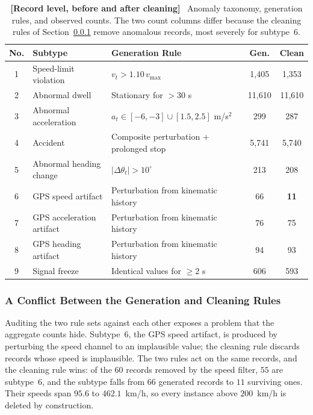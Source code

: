 \documentclass[journal]{IEEEtran}
\begin{document}
\begin{table}[!htbp]
  \centering
  \caption{\textbf{[Record level, before and after cleaning]}~ Anomaly taxonomy, generation rules, and observed counts. The two count columns differ because the cleaning rules of Section~\ref{sec:cleaning_conflict} remove anomalous records, most severely for subtype~6.}
  \label{tab:anomaly_taxonomy}
  \renewcommand{\arraystretch}{1.15}
  \footnotesize
  \begin{tabularx}{\columnwidth}{@{}c>{\raggedright\arraybackslash}p{}>{\raggedright\arraybackslash}X c c@{}}
    \toprule
    \textbf{No.} & \textbf{Subtype} & \textbf{Generation Rule} & \textbf{Gen.} & \textbf{Clean} \\ \midrule
    1 & Speed-limit violation & $v_t > 1.10\,v_{\max}$ & 1{,}405 & 1{,}353 \\
    2 & Abnormal dwell & Stationary for $>30$ s & 11{,}610 & 11{,}610 \\
    3 & Abnormal acceleration & $a_t\in[-6,-3]\cup[1.5,2.5]$ m/s$^2$ & 299 & 287 \\
    4 & Accident & Composite perturbation + prolonged stop & 5{,}741 & 5{,}740 \\
    5 & Abnormal heading change & $|\Delta\theta_t|>10^\circ$ & 213 & 208 \\
    6 & GPS speed artifact & Perturbation from kinematic history & 66 & \textbf{11} \\
    7 & GPS acceleration artifact & Perturbation from kinematic history & 76 & 75 \\
    8 & GPS heading artifact & Perturbation from kinematic history & 94 & 93 \\
    9 & Signal freeze & Identical values for $\geq2$ s & 606 & 593 \\ \bottomrule
  \end{tabularx}
\end{table}

\subsubsection{A Conflict Between the Generation and Cleaning Rules}
\label{sec:cleaning_conflict}
Auditing the two rule sets against each other exposes a problem that the
aggregate counts hide. Subtype~6, the GPS speed artifact, is produced by
perturbing the speed channel to an implausible value; the cleaning rule
discards records whose speed is implausible. The two rules act on the same
records, and the cleaning rule wins: of the $60$ records removed by the speed
filter, $55$ are subtype~6, and the subtype falls from $66$ generated records
to $11$ surviving ones. Their speeds span $95.6$ to $462.1$~km/h, so every
instance above $200$~km/h is deleted by construction.
\end{document}
